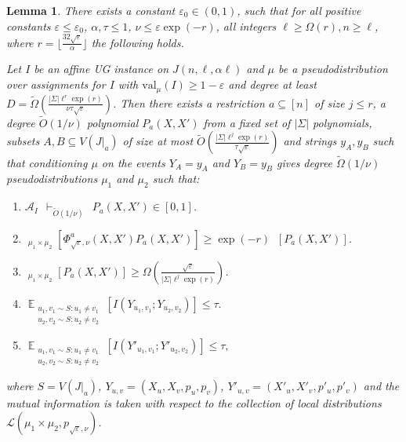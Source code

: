 \documentclass[11pt]{article}
\DeclareMathOperator*{\E}{\mathbb{E}}
\DeclareMathOperator*{\pE}{\widetilde{\mathbb{E}}}
\def \cA {\mathcal{A}}
\def \cL {\mathcal{L}}
\def \tO {\widetilde{O}}
\def \eps {{\varepsilon}}
\def \val {\mathrm{val}}
\newtheorem{lemma}[theorem]{Lemma}
\theoremstyle{definition}
\begin{document}
\begin{lemma}\label{lem:sp-j}
There exists a constant $\eps_0 \in (0,1)$, such that for all positive constants $\eps \leq \eps_0$, $\alpha, \tau \leq 1$, $\nu \leq \eps \exp(-r)$, all integers $\ell \geq \Omega(r), n \geq \ell$, where $r = \lfloor \frac{32\sqrt{\eps}}{\alpha}\rfloor$ the following holds. 

Let $I$ be an affine UG instance on $J(n,\ell,\alpha\ell)$ and $\mu$ be a pseudodistribution over assignments for $I$ with $\val_\mu(I) \geq 1-\eps$ and degree at least $D = \widetilde{\Omega}\left(\frac{|\Sigma|\ell^r\exp(r)}{\nu\tau\sqrt{\eps}}\right)$. Then there exists a restriction $a \subseteq [n]$ of size $j \leq r$, a degree $\widetilde{O}(1/\nu)$ polynomial $P_a(X,X')$ from a fixed set of $|\Sigma|$ polynomials, subsets $A, B \subseteq V(J|_a)$ of size at most $\tO(\frac{|\Sigma|\ell^j\exp(r)}{\tau\sqrt{\eps}})$ and strings $y_A, y_B$ such that conditioning $\mu$ on the events $Y_A = y_A$ and $Y_B = y_B$ gives degree $\widetilde{\Omega}(1/\nu)$ pseudodistributions $\mu_1$ and $\mu_2$ such that:
\begin{enumerate}
\item $\cA_I  ~~\vdash_{\widetilde{O}(1/\nu)} ~~ P_a(X,X') \in [0,1]$.
\item $\pE_{\mu_1 \times \mu_2}[\Phi^a_{\sqrt{\eps},\nu}(X,X')P_a(X,X')] \geq \exp(-r) \pE[P_a(X,X')]$.
\item $\pE_{\mu_1 \times \mu_2}[P_a(X,X')] \geq \Omega\left(\frac{\sqrt{\eps}}{|\Sigma|\ell^{j}\exp(r)}\right)$.
\item $\E_{\substack{u_1,v_1 \sim S: u_1 \neq v_1\\ u_2,v_2 \sim S: u_2 \neq v_2}}[I(Y_{u_1,v_1};Y_{u_2,v_2})] \leq \tau.$
\item $\E_{\substack{u_1,v_1 \sim S: u_1 \neq v_1\\ u_2,v_2 \sim S: u_2 \neq v_2}}[I(Y'_{u_1,v_1};Y'_{u_2,v_2})] \leq \tau,$
\end{enumerate}
where $S = V(J|_a)$, $Y_{u,v} = (X_u,X_v,p_u,p_v)$, $Y'_{u,v} = (X'_u,X'_v,p'_u,p'_v)$ and the mutual information is taken with respect to the collection of local distributions $\cL(\mu_1 \times \mu_2,p_{\sqrt{\eps},\nu})$. 
\end{lemma}
\end{document}
